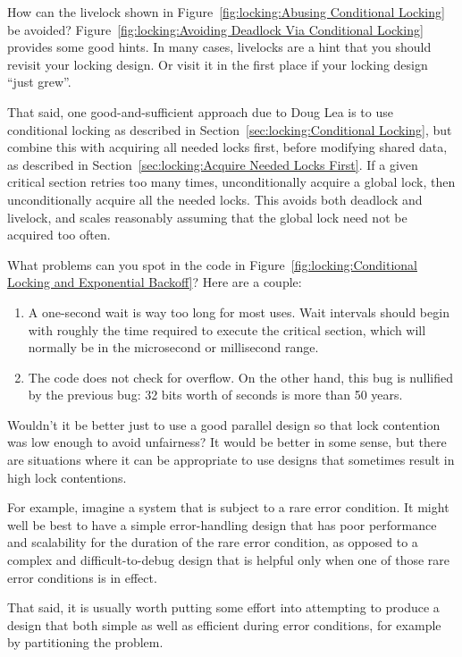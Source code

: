 \QuickQ{}
	How can the livelock shown in
	Figure~\ref{fig:locking:Abusing Conditional Locking}
	be avoided?
\QuickA{}
	Figure~\ref{fig:locking:Avoiding Deadlock Via Conditional Locking}
	provides some good hints.
	In many cases, livelocks are a hint that you should revisit your
	locking design.
	Or visit it in the first place if your locking design
	``just grew''.

	That said, one good-and-sufficient approach due to Doug Lea
	is to use conditional locking as described in
	Section~\ref{sec:locking:Conditional Locking}, but combine this
	with acquiring all needed locks first, before modifying shared
	data, as described in
	Section~\ref{sec:locking:Acquire Needed Locks First}.
	If a given critical section retries too many times,
	unconditionally acquire
	a global lock, then unconditionally acquire all the needed locks.
	This avoids both deadlock and livelock, and scales reasonably
	assuming that the global lock need not be acquired too often.

\QuickQ{}
	What problems can you spot in the code in
	Figure~\ref{fig:locking:Conditional Locking and Exponential Backoff}?
\QuickA{}
	Here are a couple:
	\begin{enumerate}
	\item	A one-second wait is way too long for most uses.
		Wait intervals should begin with roughly the time
		required to execute the critical section, which will
		normally be in the microsecond or millisecond range.
	\item	The code does not check for overflow.
		On the other hand, this bug is nullified
		by the previous bug: 32 bits worth of seconds is
		more than 50 years.
	\end{enumerate}

\QuickQ{}
	Wouldn't it be better just to use a good parallel design
	so that lock contention was low enough to avoid unfairness?
\QuickA{}
	It would be better in some sense, but there are situations
	where it can be appropriate to use
	designs that sometimes result in high lock contentions.

	For example, imagine a system that is subject to a rare error
	condition.
	It might well be best to have a simple error-handling design
	that has poor performance and scalability for the duration of
	the rare error condition, as opposed to a complex and
	difficult-to-debug design that is helpful only when one of
	those rare error conditions is in effect.

	That said, it is usually worth putting some effort into
	attempting to produce a design that both simple as well as
	efficient during error conditions, for example by partitioning
	the problem.

